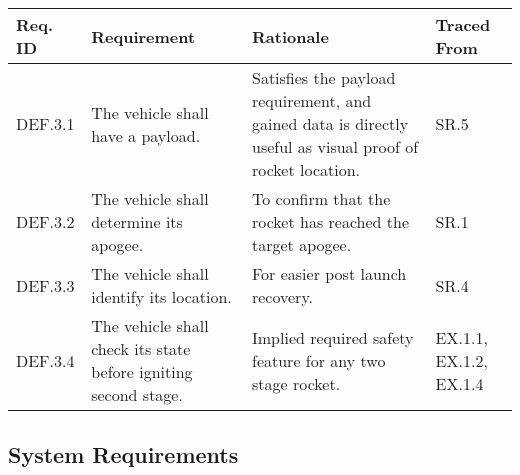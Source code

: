\begin{table}[htbp]
    \centering
    \footnotesize 
    \setlength{\tymin}{40pt}
    \let\raggedright\RaggedRight
    
    \begin{tabulary}{\textwidth}{@{}LLLL@{}}
    \toprule
        \textbf{Req. ID} & \textbf{Requirement} & \textbf{Rationale} & \textbf{Traced From} \\
    \midrule
        DEF.3.1 & The vehicle shall have a payload. & Satisfies the payload requirement, and gained data is directly useful as visual proof of rocket location. & SR.5 \\
        DEF.3.2 & The vehicle shall determine its apogee. & To confirm that the rocket has reached the target apogee. & SR.1 \\ 
        DEF.3.3 & The vehicle shall identify its location. & For easier post launch recovery.
        & SR.4 \\
        DEF.3.4 & The vehicle shall check its state before igniting second stage. & Implied required safety feature for any two stage rocket. & EX.1.1, EX.1.2, EX.1.4 \\
    \bottomrule
    \end{tabulary}

    \label{table:req-func-3}
\end{table}


\subsection{System Requirements}

